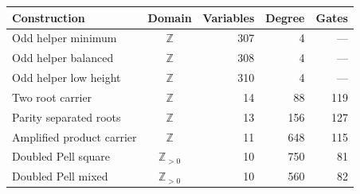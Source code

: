 \begin{center}\small
\begin{tabular}{lcrrr}
\toprule
Construction & Domain & Variables & Degree & Gates\\
\midrule
Odd helper minimum & $\mathbb Z$ & 307 & 4 & ---\\
Odd helper balanced & $\mathbb Z$ & 308 & 4 & ---\\
Odd helper low height & $\mathbb Z$ & 310 & 4 & ---\\
Two root carrier & $\mathbb Z$ & 14 & 88 & 119\\
Parity separated roots & $\mathbb Z$ & 13 & 156 & 127\\
Amplified product carrier & $\mathbb Z$ & 11 & 648 & 115\\
Doubled Pell square & $\mathbb Z_{>0}$ & 10 & 750 & 81\\
Doubled Pell mixed & $\mathbb Z_{>0}$ & 10 & 560 & 82\\
\bottomrule
\end{tabular}
\end{center}
